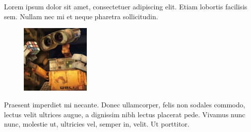 Lorem ipsum dolor sit amet, consectetuer adipiscing elit. Etiam lobortis facilisis sem. Nullam nec mi et neque pharetra sollicitudin.
\begin{figure}[htbp]
   \includegraphics[width=0.3\textwidth]{images/wall-e.jpg}
\end{figure}

Praesent imperdiet mi necante. Donec ullamcorper, felis non sodales commodo, lectus velit ultrices augue,
a dignissim nibh lectus placerat pede. Vivamus nunc nunc, molestie ut, ultricies
vel, semper in, velit. Ut porttitor.


